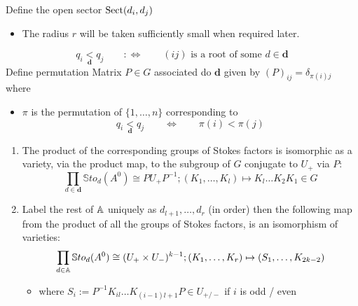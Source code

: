 \begin{defn}
  Define the open sector $\operatorname{Sect}(d_i,d_j)$
  \begin{center}
  \end{center}
  \begin{itemize}
    \item The radius \textcolor{green!40!black}{$r$} will be taken sufficiently
      small when required later.
  \end{itemize}
\end{defn}
\[
  q_i\underset{\textbf{d}}{<}q_j \qquad :\Leftrightarrow
    \qquad (ij) \text{ is a root of some } d\in\textbf{d}
\]
Define permutation Matrix $P\in G$ associated do $\textbf{d}$ given by
$(P)_{ij}=\delta_{\pi(i)j}$ where
\begin{itemize}
  \item $\pi$ is the permutation of $\{1,\dots,n\}$ corresponding to
  \[
    q_i\underset{\textbf{d}}{<}q_j \qquad \Leftrightarrow \qquad \pi(i)<\pi(j)
  \]
\end{itemize}
\begin{lem}[3.2]
  \begin{enumerate}
    \item The product of the corresponding groups of Stokes factors is
    isomorphic as a variety, via the product map, to the subgroup of $G$
    conjugate to $U_+$ via $P$:
    \[
    \prod_{d\in\textbf{d}}\mathbb{S}to_d(A^0)\cong PU_+P^{-1} ;
    (K_1,\dots,K_l)\mapsto K_l\dots K_2K_1\in G
    \]
    \item Label the rest of $\mathbb{A}$ uniquely as $d_{l+1},\dots,d_r$ (in order)
    then the following map from the product of all the groups of Stokes
    factors, is an isomorphism of varieties:
    \[
    \prod_{d\in\mathbb{A}}\mathbb{S}to_d(A^0)\cong (U_+\times U_-)^{k-1} ;
    (K_1,\dots,K_r)\mapsto (S_1,\dots,K_{2k-2})
    \]
    \begin{itemize}
      \item where $S_i:=P^{-1}K_{il}\dots K_{(i-1)l+1}P\in U_{+/-}$ if $i$ is
      odd / even
    \end{itemize}
  \end{enumerate}
\end{lem}
